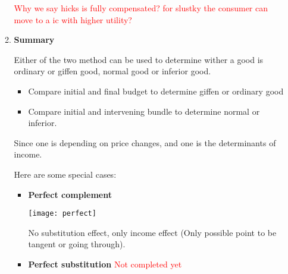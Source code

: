 \documentclass[10pt]{article}
\newenvironment{changemargin}[2]{%
  \begin{list}{}{%
    \setlength{\topsep}{0pt}%
    \setlength{\leftmargin}{#1}%
    \setlength{\rightmargin}{#2}%
    \setlength{\listparindent}{\parindent}%
    \setlength{\itemindent}{\parindent}%
    \setlength{\parsep}{\parskip}%
  }%
  \item[]}{\end{list}}
\begin{document}
\begin{changemargin}{-0.125in}{0in}
\begin{enumerate}
\begin{enumerate}
                      \smallskip
                      
                      \textcolor{red}{Why we say hicks is fully compensated? for slustky the consumer can move to a ic with higher utility?}
                      
                      \item
                      \textbf{Summary}
                      
                      \smallskip
                      
                      Either of the two method can be used to determine wither a good is ordinary or giffen good, normal good or inferior good. 
                          \begin{itemize}
                          	\item Compare initial and final budget to determine giffen or ordinary good
                          	\item Compare initial and  intervening bundle to determine normal or inferior. 
                          \end{itemize}
                     Since one is depending on price changes, and one is the determinants of income.
                     
                     \medskip
                     
                     Here are some special cases: 
                     \begin{itemize}
                     	\item 
                     	\textbf{Perfect complement}
                     	  \begin{center}\texttt{[image: perfect]}
                     	  \end{center}
                     	  
                     	  \smallskip
                     	  
                     	  No substitution effect, only income effect (Only possible point to be tangent or going through).
                     	  
                     	  \item 
                     	  \textbf{Perfect substitution}
                     	  \textcolor{red}{Not completed yet}
                     \end{itemize}
                     
                     \medskip
                     

\end{enumerate}
\end{enumerate}
\end{changemargin}
\end{document}
